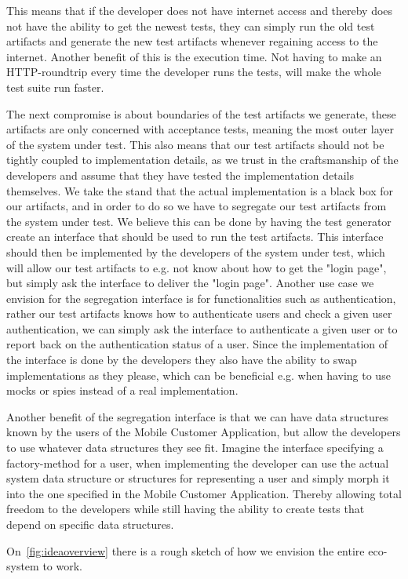 This means that if the developer does not have internet access and thereby does not have the ability to get the newest tests, they can simply run the old test artifacts and generate the new test artifacts whenever regaining access to the internet. Another benefit of this is the execution time. 
Not having to make an HTTP-roundtrip every time the developer runs the tests, will make the whole test suite run faster.

The next compromise is about boundaries of the test artifacts we generate, these artifacts are only concerned with acceptance tests, meaning the most outer layer of the system under test. 
This also means that our test artifacts should not be tightly coupled to implementation details, as we trust in the craftsmanship of the developers and assume that they have tested the implementation details themselves.
We take the stand that the actual implementation is a black box for our artifacts, and in order to do so we have to segregate our test artifacts from the system under test.
We believe this can be done by having the test generator create an interface that should be used to run the test artifacts.
This interface should then be implemented by the developers of the system under test, which will allow our test artifacts to e.g. not know about how to get the "login page", but simply ask the interface to deliver the "login page".
Another use case we envision for the segregation interface is for functionalities such as authentication, rather our test artifacts knows how to authenticate users and check a given user authentication, we can simply ask the interface to authenticate a given user or to report back on the authentication status of a user.
Since the implementation of the interface is done by the developers they also have the ability to swap implementations as they please, which can be beneficial e.g. when having to use mocks or spies instead of a real implementation.

Another benefit of the segregation interface is that we can have data structures known by the users of the Mobile Customer Application, but allow the developers to use whatever data structures they see fit. Imagine the interface specifying a factory-method for a user, when implementing the developer can use the actual system data structure or structures for representing a user and simply morph it into the one specified in the Mobile Customer Application. Thereby allowing total freedom to the developers while still having the ability to create tests that depend on specific data structures.

On~\autoref{fig:ideaoverview} there is a rough sketch of how we envision the entire eco-system to work.
